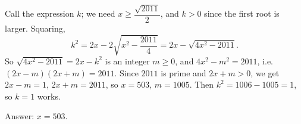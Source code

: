 Call the expression $k$; we need $x\ge\dfrac{\sqrt{2011}}2$, and $k>0$ since the first root is larger. Squaring,
\[k^2=2x-2\sqrt{x^2-\dfrac{2011}4}=2x-\sqrt{4x^2-2011}.\]
So $\sqrt{4x^2-2011}=2x-k^2$ is an integer $m\ge0$, and $4x^2-m^2=2011$, i.e. $(2x-m)(2x+m)=2011$. Since $2011$ is prime and $2x+m>0$, we get $2x-m=1$, $2x+m=2011$, so $x=503$, $m=1005$. Then $k^2=1006-1005=1$, so $k=1$ works.

Answer: $x=\boxed{503}$.
